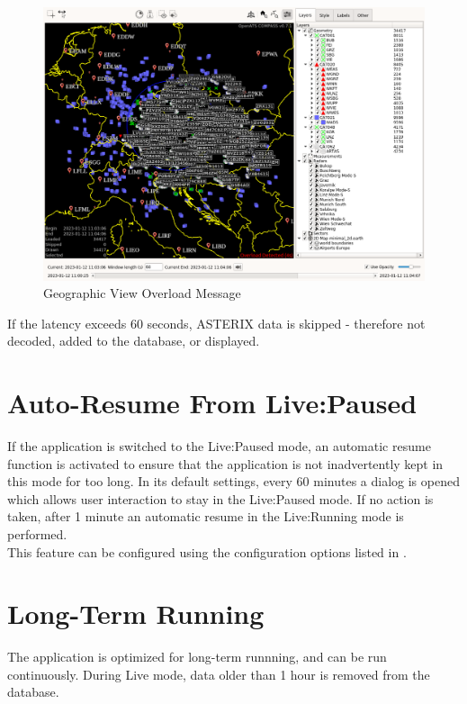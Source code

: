 \begin{figure}[H]
    \hspace*{-2.5cm}
    \includegraphics[width=19cm,frame]{figures/geoview_overload.png}
  \caption{Geographic View Overload Message}
\end{figure} 

If the latency exceeds 60 seconds, ASTERIX data is skipped - therefore not decoded, added to the database, or displayed.

\section{Auto-Resume From Live:Paused}

If the application is switched to the Live:Paused mode, an automatic resume function is activated to ensure that the application is not inadvertently kept in this mode for too long. In its default settings, every 60 minutes a dialog is opened which allows user interaction to stay in the Live:Paused mode. If no action is taken, after 1 minute an automatic resume in the Live:Running mode is performed. \\

This feature can be configured using the configuration options listed in .

\section{Long-Term Running}

The application is optimized for long-term runnning, and can be run continuously. During Live mode, data older than 1 hour is removed from the database. \\

